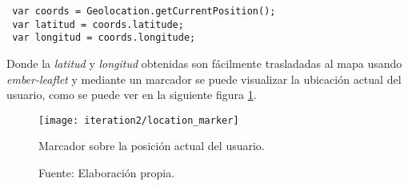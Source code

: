 \begin{verbatim}
 var coords = Geolocation.getCurrentPosition();
 var latitud = coords.latitude;
 var longitud = coords.longitude;
\end{verbatim}

Donde la \emph{latitud} y \emph{longitud} obtenidas son fácilmente trasladadas al mapa usando \emph{ember-leaflet} y mediante un marcador se puede visualizar la ubicación actual del usuario, como se puede ver en la siguiente figura \ref{fig:location_marker}.

\begin{figure}[H]
 \begin{center}
   \texttt{[image: iteration2/location\_marker]}
   \caption{Marcador sobre la posición actual del usuario.}
   \label{fig:location_marker}
   \caption*{Fuente: Elaboración propia.}
 \end{center}
\end{figure}


%
%
%
%



